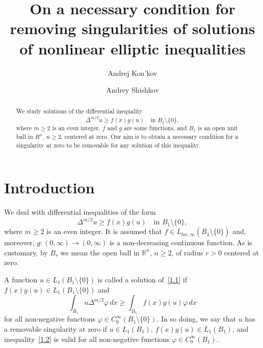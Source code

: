 \documentclass[11pt]{amsart}
\title[On a necessary condition]{On a necessary condition for removing singularities of solutions of nonlinear elliptic inequalities}
\author[A. Kon'kov]{Andrej Kon'kov}
\author[A. Shishkov]{Andrey Shishkov}
\theoremstyle{definition}
\numberwithin{equation}{section}
\begin{document}
\begin{abstract}
We study solutions of the differential inequality
$$
	\Delta^{m / 2} u \ge f (x) g (u)
	\quad
	\mbox{in } B_1 \setminus \{ 0 \},
$$
where $m \ge 2$ is an even integer, $f$ and $g$ are some functions, and $B_1$ is an open unit ball in $R^n$, $n \ge 2$, centered at zero.
Our aim is to obtain a necessary condition for a singularity at zero to be removable for any solution of this inequality.
\end{abstract}

\maketitle


\section{Introduction}

We deal with differential inequalities of the form
\begin{equation}
	\Delta^{m / 2} u \ge f (x) g (u)
	\quad
	\mbox{in } B_1 \setminus \{ 0 \},
	\label{1.1}
\end{equation}
where $m \ge 2$ is an even integer. It is assumed that $f \in L_{loc, \infty} (\overline{B_1} \setminus \{ 0 \})$ and, moreover, $g : (0, \infty) \to (0, \infty)$ is a non-decreasing continuous function.
As is customary, by $B_r$ we mean the open ball in $\mathbb R^n$, $n \ge 2$, of radius $r > 0$ centered at zero.

A function $u \in L_1 (B_1 \setminus \{ 0 \})$ is called a solution of~\eqref{1.1} if $f (x) {g (u)} \in L_1 (B_1 \setminus \{ 0 \})$ and
\begin{equation}
	\int_{B_1}
	u
	\Delta^{m / 2} \varphi
	\,
	dx
	\ge
	\int_{B_1}
	f (x)
	g (u)
	\varphi
	\,
	dx
	\label{1.2}
\end{equation}
for all non-negative functions $\varphi \in C_0^\infty (B_1 \setminus \{ 0 \})$.
In so doing, we say that $u$ has a removable singularity at zero if
$u \in L_1 (B_1)$,
$f (x) {g (u)} \in L_1 (B_1)$, 
and inequality~\eqref{1.2} is valid for all non-negative functions $\varphi \in C_0^\infty (B_1)$.
\end{document}
